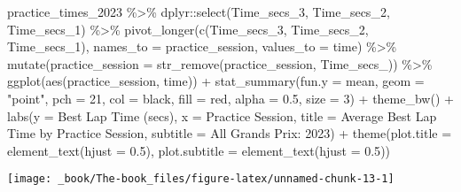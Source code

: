 \documentclass[
]{book}
\newenvironment{Shaded}{\begin{snugshade}}{\end{snugshade}}
\newcommand{\AttributeTok}[1]{\textcolor[rgb]{0.77,0.63,0.00}{#1}}
\newcommand{\DecValTok}[1]{\textcolor[rgb]{0.00,0.00,0.81}{#1}}
\newcommand{\FloatTok}[1]{\textcolor[rgb]{0.00,0.00,0.81}{#1}}
\newcommand{\FunctionTok}[1]{\textcolor[rgb]{0.00,0.00,0.00}{#1}}
\newcommand{\NormalTok}[1]{#1}
\newcommand{\SpecialCharTok}[1]{\textcolor[rgb]{0.00,0.00,0.00}{#1}}
\newcommand{\StringTok}[1]{\textcolor[rgb]{0.31,0.60,0.02}{#1}}
\begin{document}
\begin{Shaded}
\begin{Highlighting}[]
\NormalTok{practice\_times\_2023 }\SpecialCharTok{\%\textgreater{}\%}
\NormalTok{  dplyr}\SpecialCharTok{::}\FunctionTok{select}\NormalTok{(Time\_secs\_3, Time\_secs\_2, Time\_secs\_1) }\SpecialCharTok{\%\textgreater{}\%}
  \FunctionTok{pivot\_longer}\NormalTok{(}\FunctionTok{c}\NormalTok{(Time\_secs\_3, Time\_secs\_2, Time\_secs\_1), }\AttributeTok{names\_to =} \StringTok{\textquotesingle{}practice\_session\textquotesingle{}}\NormalTok{, }\AttributeTok{values\_to =} \StringTok{\textquotesingle{}time\textquotesingle{}}\NormalTok{) }\SpecialCharTok{\%\textgreater{}\%}
  \FunctionTok{mutate}\NormalTok{(}\AttributeTok{practice\_session =} \FunctionTok{str\_remove}\NormalTok{(practice\_session, }\StringTok{\textquotesingle{}Time\_secs\_\textquotesingle{}}\NormalTok{)) }\SpecialCharTok{\%\textgreater{}\%}
  \FunctionTok{ggplot}\NormalTok{(}\FunctionTok{aes}\NormalTok{(practice\_session, time)) }\SpecialCharTok{+}
  \FunctionTok{stat\_summary}\NormalTok{(}\AttributeTok{fun.y =}\NormalTok{ mean, }
               \AttributeTok{geom =} \StringTok{"point"}\NormalTok{, }\AttributeTok{pch =} \DecValTok{21}\NormalTok{, }\AttributeTok{col =} \StringTok{\textquotesingle{}black\textquotesingle{}}\NormalTok{, }\AttributeTok{fill =}  \StringTok{\textquotesingle{}red\textquotesingle{}}\NormalTok{, }\AttributeTok{alpha =} \FloatTok{0.5}\NormalTok{, }\AttributeTok{size =} \DecValTok{3}\NormalTok{) }\SpecialCharTok{+} 
  \FunctionTok{theme\_bw}\NormalTok{() }\SpecialCharTok{+}
  \FunctionTok{labs}\NormalTok{(}\AttributeTok{y =} \StringTok{\textquotesingle{}Best Lap Time (secs)\textquotesingle{}}\NormalTok{,}
       \AttributeTok{x =} \StringTok{\textquotesingle{}Practice Session\textquotesingle{}}\NormalTok{,}
       \AttributeTok{title =} \StringTok{\textquotesingle{}Average Best Lap Time by Practice Session\textquotesingle{}}\NormalTok{,}
       \AttributeTok{subtitle =} \StringTok{\textquotesingle{}All Grands Prix: 2023\textquotesingle{}}\NormalTok{) }\SpecialCharTok{+}
  \FunctionTok{theme}\NormalTok{(}\AttributeTok{plot.title =} \FunctionTok{element\_text}\NormalTok{(}\AttributeTok{hjust =} \FloatTok{0.5}\NormalTok{),}
        \AttributeTok{plot.subtitle =} \FunctionTok{element\_text}\NormalTok{(}\AttributeTok{hjust =} \FloatTok{0.5}\NormalTok{))}
\end{Highlighting}
\end{Shaded}

\begin{center}\texttt{[image: \_book/The-book\_files/figure-latex/unnamed-chunk-13-1]} \end{center}
\end{document}
